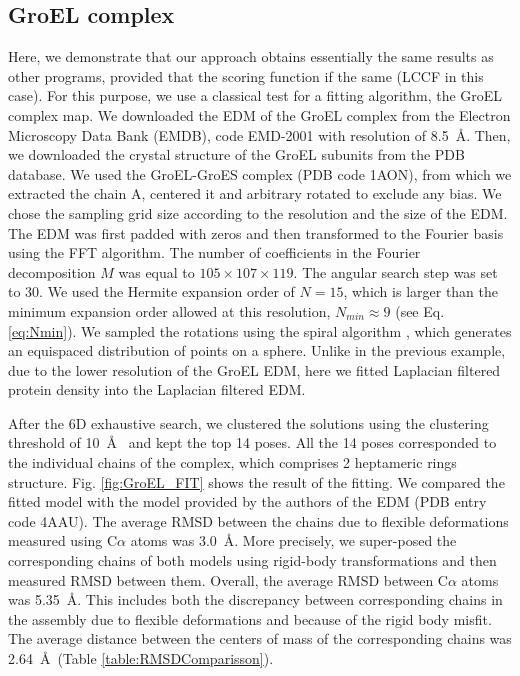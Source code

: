 \subsection{GroEL complex}
Here, we demonstrate that our approach obtains essentially the same results as other programs, provided that the scoring function if the same (LCCF in this case).
For this purpose, we use a classical test for a fitting algorithm, the GroEL complex map. 
We downloaded the EDM of the GroEL complex from the Electron Microscopy Data Bank (EMDB), code EMD-2001 with 
resolution of 8.5~\AA.
Then, we downloaded the crystal structure of the GroEL subunits from the PDB database. We used the GroEL-GroES complex (PDB code 1AON), from which we extracted the chain A, 
centered it and arbitrary rotated to exclude any bias.
We chose the sampling grid size according to the resolution and the size of the EDM. The EDM was first padded with zeros and then transformed to the Fourier basis using the FFT algorithm.
The number of coefficients in the Fourier decomposition $M$
was equal to $ 105 \times 107 \times 119 $.
The angular search step was set to 30\textdegree. 
We used the Hermite expansion order of $N=15$, which is larger than the minimum expansion order allowed at this resolution, $N_{min}\approx9$ (see Eq. \ref{eq:Nmin}).
We sampled the rotations using the spiral algorithm \cite{saff1997distributing},
which generates an equispaced distribution of points on a sphere.
Unlike in the previous example, due to the lower resolution of the GroEL EDM, here we fitted Laplacian filtered protein density into the Laplacian filtered EDM.

After the 6D exhaustive search, we clustered the solutions using the clustering threshold of 10~\AA~ and kept the top 14 poses.
All the 14 poses corresponded to the individual chains of the complex, which comprises 2 heptameric rings structure.
Fig. \ref{fig:GroEL_FIT} shows the result of the fitting. 
We compared the fitted model with the model provided by the authors of the EDM (PDB entry code 4AAU). The average RMSD between the chains due to flexible deformations measured using C$\alpha$ atoms 
was 3.0~\AA.
More precisely,
we super-posed the corresponding chains of both models using rigid-body transformations and then measured RMSD between them. 
%
Overall, the average RMSD between C$\alpha$ atoms was 5.35~\AA.
This includes both the discrepancy between corresponding chains in the assembly due to flexible deformations and because of the rigid body misfit. 
The average distance between the centers of mass of the corresponding chains was 2.64~\AA~(Table \ref{table:RMSDComparisson}).

